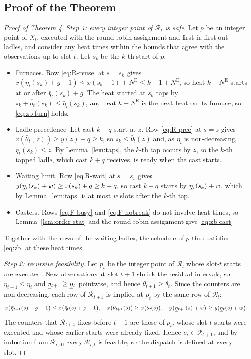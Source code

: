 \documentclass[11pt]{article}
\newcommand{\NE}{N^{\mathrm{E}}}
\newcommand{\calR}{\mathcal{R}}
\newcommand{\dmax}{\overline{d}}
\newcommand{\etamin}{\vphantom{\underline{\eta}}\smash[b]{\underline{\eta}}}
\begin{document}
\subsection{Proof of the Theorem}

\begin{proof}[Proof of Theorem 4]
\emph{Step 1: every integer point of $\calR_t$ is safe.} Let $p$ be an integer point of $\calR_t$, executed with the
round-robin assignment and first-in first-out ladles, and consider any heat times within the bounds that agree with the
observations up to slot $t$. Let $s_k$ be the $k$-th start of $p$.
\begin{itemize}[leftmargin=1.5em]
\item Furnaces. Row \eqref{eq:R-reuse} at $s=s_k$ gives $x(\bar\eta_t(s_k)+g-1)\le x(s_k-1)+\NE\le k-1+\NE$, so heat
$k+\NE$ starts at or after $\bar\eta_t(s_k)+g$. The heat started at $s_k$ taps by $s_k+\dmax_t(s_k)\le\bar\eta_t(s_k)$,
and heat $k+\NE$ is the next heat on its furnace, so \eqref{eq:zb-furn} holds.
\item Ladle precedence. Let cast $k+q$ start at $z$. Row \eqref{eq:R-prec} at $s=z$ gives
$x(\bar\theta_t(z))\ge y(z)-q\ge k$, so $s_k\le\bar\theta_t(z)$ and, as $\bar\eta_t$ is non-decreasing,
$\bar\eta_t(s_k)\le z$. By Lemma~\ref{lem:taps}, the $k$-th tap occurs by $z$, so the $k$-th tapped ladle, which cast
$k+q$ receives, is ready when the cast starts.
\item Waiting limit. Row \eqref{eq:R-wait} at $s=s_k$ gives $y(\etamin_t(s_k)+w)\ge x(s_k)+q\ge k+q$, so cast $k+q$
starts by $\etamin_t(s_k)+w$, which by Lemma~\ref{lem:taps} is at most $w$ slots after the $k$-th tap.
\item Casters. Rows \eqref{eq:F-busy} and \eqref{eq:F-nobreak} do not involve heat times, so Lemma~\ref{lem:order-stat}
and the round-robin assignment give \eqref{eq:zb-cast}.
\end{itemize}
Together with the rows of the waiting ladles, the schedule of $p$ thus satisfies \eqref{eq:zb} at these heat times.

\emph{Step 2: recursive feasibility.} Let $p_t$ be the integer point of $\calR_t$ whose slot-$t$ starts are executed.
New observations at slot $t+1$ shrink the residual intervals, so $\bar\eta_{t+1}\le\bar\eta_t$ and
$\etamin_{t+1}\ge\etamin_t$ pointwise, and hence $\bar\theta_{t+1}\ge\bar\theta_t$. Since the counters are
non-decreasing, each row of $\calR_{t+1}$ is implied at $p_t$ by the same row of $\calR_t$:
\[
x\big(\bar\eta_{t+1}(s)+g-1\big)\le x\big(\bar\eta_t(s)+g-1\big),\quad
x\big(\bar\theta_{t+1}(s)\big)\ge x\big(\bar\theta_t(s)\big),\quad
y\big(\etamin_{t+1}(s)+w\big)\ge y\big(\etamin_t(s)+w\big).
\]
The counters that $\calR_{t+1}$ fixes before $t+1$ are those of $p_t$, whose slot-$t$ starts were executed and whose
earlier starts were already fixed. Hence $p_t\in\calR_{t+1}$, and by induction from $\calR_{i,0}$, every
$\calR_{i,t}$ is feasible, so the dispatch is defined at every slot.


\end{proof}
\end{document}
